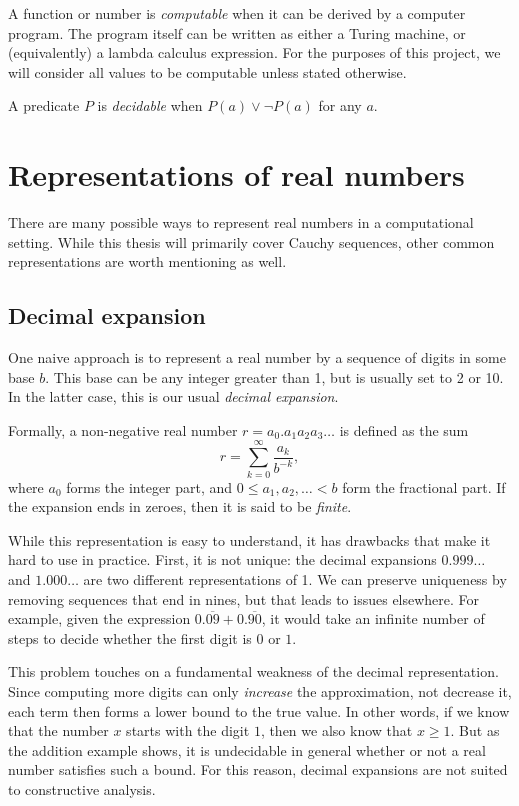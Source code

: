 \documentclass[leqno]{report}
\begin{document}
A function or number is \textit{computable} when it can be derived by a computer program. The program itself can be written as either a Turing machine, or (equivalently) a lambda calculus expression. For the purposes of this project, we will consider all values to be computable unless stated otherwise.

A predicate $P$ is \textit{decidable} when $P(a) \vee \neg P(a)$ for any $a$.

\chapter{Representations of real numbers}

There are many possible ways to represent real numbers in a computational setting. While this thesis will primarily cover Cauchy sequences, other common representations are worth mentioning as well.

\section{Decimal expansion}

One naive approach is to represent a real number by a sequence of digits in some base $b$. This base can be any integer greater than 1, but is usually set to 2 or 10. In the latter case, this is our usual \textit{decimal expansion}.

Formally, a non-negative real number $r = a_0 . a_1 a_2 a_3 \ldots$ is defined as the sum
\[
    r = \sum_{k=0}^\infty \frac{a_k}{b^{-k}},
\]
where $a_0$ forms the integer part, and $0 \leq a_1, a_2, \ldots < b$ form the fractional part. If the expansion ends in zeroes, then it is said to be \textit{finite}.

While this representation is easy to understand, it has drawbacks that make it hard to use in practice. First, it is not unique: the decimal expansions $0.999\ldots$ and $1.000\ldots$ are two different representations of 1. We can preserve uniqueness by removing sequences that end in nines, but that leads to issues elsewhere. For example, given the expression $0.\overline{09} + 0.\overline{90}$, it would take an infinite number of steps to decide whether the first digit is $0$ or $1$.

This problem touches on a fundamental weakness of the decimal representation. Since computing more digits can only \emph{increase} the approximation, not decrease it, each term then forms a lower bound to the true value. In other words, if we know that the number $x$ starts with the digit $1$, then we also know that $x \geq 1$. But as the addition example shows, it is undecidable in general whether or not a real number satisfies such a bound. For this reason, decimal expansions are not suited to constructive analysis.
\end{document}
